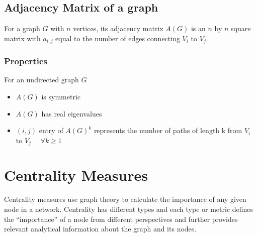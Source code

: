 \documentclass[12pt, a4paper]{article}
\begin{document}
      \subsection{Adjacency Matrix of a graph}
      For a graph $G$ with $n$ vertices, its adjacency matrix $A(G)$ is an $n$ by $n$ square matrix with $a_{i,j}$ equal to the number of edges connecting $V_i$ to $V_j$

        \subsubsection{Properties}
        For an undirected graph $G$
        \begin{itemize}
          \item $A(G)$ is symmetric 
          \item $A(G)$ has real eigenvalues
          \item $(i,j)$ entry of $A(G)^k$ represents the number of paths of length k from $V_i$ to $V_j$ $\quad \forall k \ge 1$
        \end{itemize}

    \section{Centrality Measures}
    Centrality measures use graph theory to calculate the importance of any given node in a network. Centrality has different types and each type or metric defines the “importance” of a node from different perspectives and further provides relevant analytical information about the graph and its nodes.\cite{Disney22}
\end{document}
